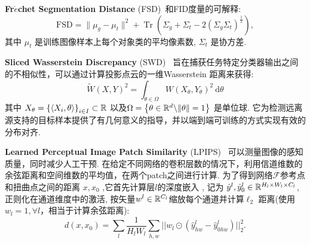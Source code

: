 \vspace{1mm}
\noindent\textbf{Fr$\acute{e}$chet Segmentation Distance} (FSD)~\cite{bau2019seeing}和FID度量的可解释:
\begin{equation}
\mathrm{FSD} = \|\mu_{g}-\mu_{t}\|^{2}+\operatorname{Tr}(\Sigma_{g}+\Sigma_{t}-2(\Sigma_{g} \Sigma_{t})^{\frac{1}{2}}),
\end{equation}
其中 $\mu_{t}$ 是训练图像样本上每个对象类的平均像素数,  $\Sigma_{t}$ 是协方差.\par

\vspace{1mm}
\noindent\textbf{Sliced Wasserstein Discrepancy} (SWD)~\cite{rabin2011wasserstein} 旨在捕获任务特定分类器输出之间的不相似性，可以通过计算投影点云的一维Wasserstein 距离来获得:
\begin{equation}
\tilde{W}(X, Y)^{2}=\int_{\theta \in \Omega} W\left(X_{\theta}, Y_{\theta}\right)^{2} \mathrm{~d} \theta
\end{equation}
其中 $X_{\theta}=\left\{\left\langle X_{i}, \theta\right\rangle\right\}_{i \in I} \subset \mathbb{R}$ 以及$\Omega=\left\{\theta \in \mathbb{R}^{d} \backslash\|\theta\|=1\right\}$ 是单位球. 
它为检测远离源支持的目标样本提供了有几何意义的指导，并以端到端可训练的方式实现有效的分布对齐.\par

\vspace{1mm}
\noindent\textbf{Learned Perceptual Image Patch Similarity} (LPIPS)~\cite{zhang2018unreasonable} 可以测量图像的感知质量，同时减少人工干预.
在给定不同网络的卷积层数的情况下，利用信道维数的余弦距离和空间维数的平均值，在两个patch之间进行计算.
为了得到网络$\mathcal{F}$参考点和扭曲点之间的距离 ${x,x_0}$ ,它首先计算层$l$的深度嵌入 , 记为 $\hat{y}^l, \hat{y}_0^l \in \mathbb{R}^{H_l\times W_l\times C_l}$, 正则化在通道维度中的激活, 按矢量$w^l \in \mathbb{R}^{C_l}$缩放每个通道并计算$\ell_2$ 距离(使用$w_l=1, \forall l$，相当于计算余弦距离):
\begin{equation}
d(x,x_0) = \sum_l \dfrac{1}{H_l W_l} \sum_{h,w} || w_l \odot ( \hat{y}_{hw}^l - \hat{y}_{0hw}^l ) ||_2^2.
\label{eqn:dist}
\end{equation}\par

